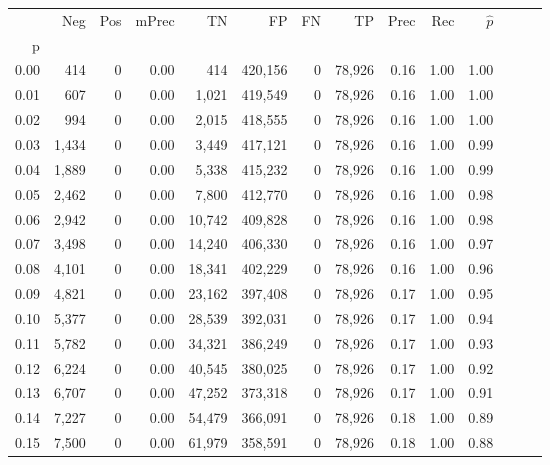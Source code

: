 \begin{tabular}{rrrrrrrrrrrrrr}
\toprule
{} &    Neg &    Pos & mPrec &       TN &       FP &      FN &      TP &  Prec &   Rec & $\hat{p}$ \\
p    &        &        &       &          &          &         &         &       &       &           \\
\midrule
0.00 &    414 &      0 &  0.00 &      414 &  420,156 &       0 &  78,926 &  0.16 &  1.00 &      1.00 \\
0.01 &    607 &      0 &  0.00 &    1,021 &  419,549 &       0 &  78,926 &  0.16 &  1.00 &      1.00 \\
0.02 &    994 &      0 &  0.00 &    2,015 &  418,555 &       0 &  78,926 &  0.16 &  1.00 &      1.00 \\
0.03 &  1,434 &      0 &  0.00 &    3,449 &  417,121 &       0 &  78,926 &  0.16 &  1.00 &      0.99 \\
0.04 &  1,889 &      0 &  0.00 &    5,338 &  415,232 &       0 &  78,926 &  0.16 &  1.00 &      0.99 \\
0.05 &  2,462 &      0 &  0.00 &    7,800 &  412,770 &       0 &  78,926 &  0.16 &  1.00 &      0.98 \\
0.06 &  2,942 &      0 &  0.00 &   10,742 &  409,828 &       0 &  78,926 &  0.16 &  1.00 &      0.98 \\
0.07 &  3,498 &      0 &  0.00 &   14,240 &  406,330 &       0 &  78,926 &  0.16 &  1.00 &      0.97 \\
0.08 &  4,101 &      0 &  0.00 &   18,341 &  402,229 &       0 &  78,926 &  0.16 &  1.00 &      0.96 \\
0.09 &  4,821 &      0 &  0.00 &   23,162 &  397,408 &       0 &  78,926 &  0.17 &  1.00 &      0.95 \\
0.10 &  5,377 &      0 &  0.00 &   28,539 &  392,031 &       0 &  78,926 &  0.17 &  1.00 &      0.94 \\
0.11 &  5,782 &      0 &  0.00 &   34,321 &  386,249 &       0 &  78,926 &  0.17 &  1.00 &      0.93 \\
0.12 &  6,224 &      0 &  0.00 &   40,545 &  380,025 &       0 &  78,926 &  0.17 &  1.00 &      0.92 \\
0.13 &  6,707 &      0 &  0.00 &   47,252 &  373,318 &       0 &  78,926 &  0.17 &  1.00 &      0.91 \\
0.14 &  7,227 &      0 &  0.00 &   54,479 &  366,091 &       0 &  78,926 &  0.18 &  1.00 &      0.89 \\
0.15 &  7,500 &      0 &  0.00 &   61,979 &  358,591 &       0 &  78,926 &  0.18 &  1.00 &      0.88 \\

\end{tabular}
